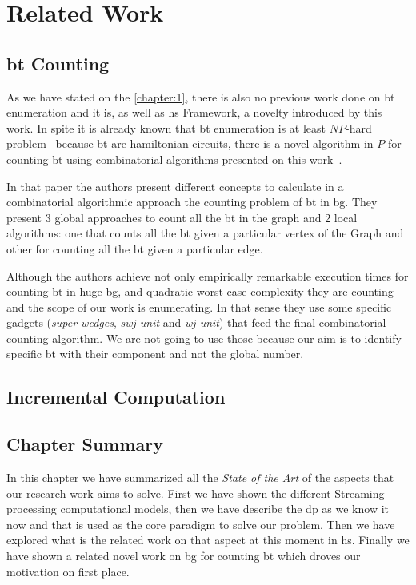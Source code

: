 \chapter{Related Work}

\section{\acrlong{bt} Counting}
As we have stated on the \autoref{chapter:1}, there is also no previous work done on \acrshort{bt} enumeration and it is, as well as \acrshort{hs} Framework, a novelty introduced by this work.
In spite it is already known that \acrshort{bt} enumeration is at least $NP$-hard problem~\cite{hamilbipartite-np} because \acrshort{bt} are hamiltonian circuits, there is a novel algorithm in $P$ 
for counting \acrshort{bt} using combinatorial algorithms presented on this work~\cite{btcount}.

In that paper the authors present different concepts to calculate in a combinatorial algorithmic approach the counting problem of \acrshort{bt} in \acrshort{bg}. They present 3 global approaches to count
all the \acrshort{bt} in the graph and 2 local algorithms: one that counts all the \acrshort{bt} given a particular vertex of the Graph and other for counting all the \acrshort{bt} given a particular edge.

Although the authors achieve not only empirically remarkable execution times for counting \acrshort{bt} in huge \acrshort{bg}, and quadratic worst case complexity they are counting and the scope of our work
is enumerating. In that sense they use some specific gadgets (\emph{super-wedges}, \emph{swj-unit} and \emph{wj-unit}) that feed the final combinatorial counting algorithm. We are not going to use those because our 
aim is to identify specific \acrshort{bt} with their component and not the global number.

\section{Incremental Computation}

\section{Chapter Summary}
In this chapter we have summarized all the \emph{State of the Art} of the aspects that our research work aims to solve.
First we have shown the different Streaming processing computational models, then we have describe the \acrshort{dp} as we know it now and that is used 
as the core paradigm to solve our problem. Then we have explored what is the related work on that aspect at this moment in \acrshort{hs}. Finally we have shown 
a related novel work on \acrlong{bg} for counting \acrlong{bt} which droves our motivation on first place.
